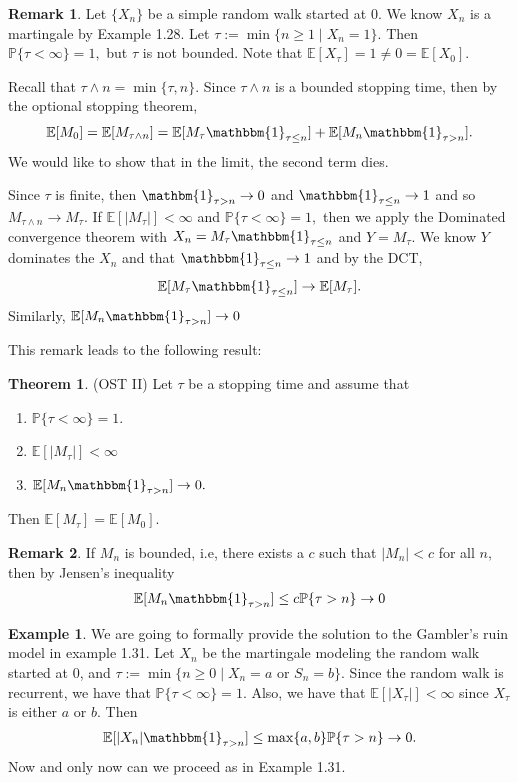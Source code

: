 \documentclass[10pt, oneside]{article}
\newcommand{\bbP}{\mathbb{P}}
\newcommand{\bbE}{\mathbb{E}}
\theoremstyle{definition}
\newtheorem{exmp}{Example}[section]
\newtheorem{thm}{Theorem}
\newtheorem{rem}{Remark}
\begin{document}
\begin{rem}
    Let $\{X_n\}$ be a simple random walk started at $0.$ We know $X_n$ is a martingale by Example 1.28. Let $\tau:= \min\{n \geq 1 \mid X_n = 1\}.$ Then $\bbP\{\tau < \infty\} = 1,$ but $\tau$ is not bounded. Note that $\bbE[X_\tau]= 1 \neq 0 = \bbE[X_0].$
    
    Recall that $\tau \wedge n = \min\{\tau ,n\}.$ Since $\tau\wedge n $ is a bounded stopping time, then by the optional stopping theorem, \[\bbE[M_0] = \bbE[M_{\tau \wedge n}] = \bbE[M_\tau \mathbbm{1}_{\tau \leq n}] + \bbE[M_n \mathbbm{1}_{\tau >n}].\] We would like to show that in the limit, the second term dies. 

    Since $\tau$ is finite, then $\mathbm{1}_{\tau >n} \to 0$ and $\mathbbm{1}_{\tau \leq n} \to 1$ and so $M_{\tau \wedge n}\to M_{\tau}.$ If $\bbE[|M_\tau|] < \infty$ and $\bbP\{\tau < \infty\} = 1,$ then we apply the Dominated convergence theorem with $X_n = M_\tau \mathbbm{1}_{\tau \leq n}$ and $Y = M_\tau.$ We know $Y$ dominates the $X_n$ and that $\mathbbm{1}_{\tau \leq n} \to 1$ and by the DCT, 
    \[\bbE[M_\tau\mathbbm{1}_{\tau \leq n}] \to \bbE[M_\tau].\] Similarly, $\bbE[M_n \mathbbm{1}_{\tau > n}] \to 0$
\end{rem}
This remark leads to the following result:
\begin{thm}
    (OST II) Let $\tau$ be a stopping time and assume that 
    \begin{enumerate}
        \item $\bbP\{\tau < \infty\} = 1.$
        \item $\bbE[|M_\tau|] < \infty$
        \item $\bbE[M_n\mathbbm{1}_{\tau > n}] \to 0.$
    \end{enumerate}
    Then $\bbE[M_\tau] = \bbE[M_0].$
\end{thm}

\begin{rem}
    If $M_n$ is bounded, i.e, there exists a $c$ such that $|M_n| < c$ for all $n,$ then by Jensen's inequality
    \begin{align*}
        \bbE[M_n\mathbbm{1}_{\tau > n}] \leq c\bbP\{\tau >n\} \to 0
    \end{align*}
\end{rem}

\begin{exmp}
    We are going to formally provide the solution to the Gambler's ruin model in example 1.31. Let $X_n$ be the martingale modeling the random walk started at $0$, and $\tau := \min\{n \geq 0 \mid X_n = a \text{ or } S_n = b\}.$ Since the random walk is recurrent, we have that $\bbP\{\tau < \infty\} = 1.$ Also, we have that $\bbE[|X_\tau|] < \infty$ since $X_\tau$ is either $a$ or $b$. Then 
    \begin{align*}
        \bbE[|X_n|\mathbbm{1}_{\tau >n}] \leq \max\{a,b\}\bbP\{\tau >n\} \to 0.
    \end{align*}
    Now and only now can we proceed as in Example 1.31.
\end{exmp}
\end{document}

